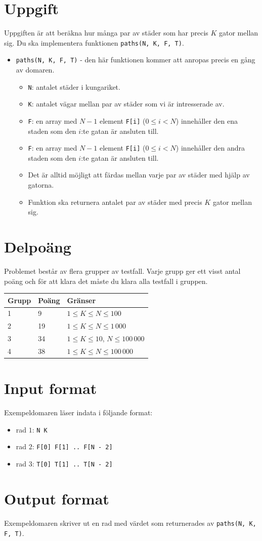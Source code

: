 \section*{Uppgift}
Uppgiften är att beräkna hur många par av städer som har precis $K$ gator mellan sig. Du ska implementera funktionen \texttt{paths(N, K, F, T)}.
\begin{itemize}
  \item \texttt{paths(N, K, F, T)} - den här funktionen kommer att anropas precis en gång av domaren.
  \begin{itemize}
    \item \texttt{N}: antalet städer i kungariket.
    \item \texttt{K}: antalet vägar mellan par av städer som vi är intresserade av.
    \item \texttt{F}: en array med $N-1$ element \texttt{F[i]} ($0 \le i < N$) innehåller den ena staden som den $i$:te gatan är ansluten till.
    \item \texttt{F}: en array med $N-1$ element \texttt{F[i]} ($0 \le i < N$) innehåller den andra staden som den $i$:te gatan är ansluten till.
    \item Det är alltid möjligt att färdas mellan varje par av städer med hjälp av gatorna.
    \item Funktion ska returnera antalet par av städer med precis $K$ gator mellan sig.
  \end{itemize}
\end{itemize}

\section*{Delpoäng}
Problemet består av flera grupper av testfall. Varje grupp ger ett visst antal poäng och för att klara det måste du klara alla testfall i gruppen.

\begin{tabular}{|l|l|l|}
  \hline
  \textbf{Grupp} & \textbf{Poäng} & \textbf{Gränser} \\ \hline
  1 & 9 & $1 \le K \le N \le 100$ \\ \hline
  2 & 19 & $1 \le K \le N \le 1\,000$ \\ \hline
  3 & 34 & $1 \le K \le 10$, $N \le 100\,000$ \\ \hline
  4 & 38 & $1 \le K \le N \le 100\,000$ \\ \hline
\end{tabular}

\section*{Input format}
Exempeldomaren läser indata i följande format:

\begin{itemize}
  \item rad $1$: \texttt{N K}
  \item rad $2$: \texttt{F[0] F[1] .. F[N - 2]}
  \item rad $3$: \texttt{T[0] T[1] .. T[N - 2]}
\end{itemize}

\section*{Output format}
Exempeldomaren skriver ut en rad med värdet som returnerades av \texttt{paths(N, K, F, T)}.
